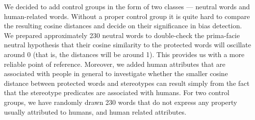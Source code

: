 \documentclass[
  12pt,
]{book}
\begin{document}
We decided to add control groups in the form of two classes --- neutral words and human-related words. Without a proper control group it is quite hard to compare the resulting cosine distances and decide on their significance in bias detection. We prepared approximately 230 neutral words to double-check the prima-facie neutral hypothesis that their cosine similarity to the protected words will oscillate around 0 (that is, the distances will be around 1). This provides us with a more reliable point of reference. Moreover, we added human attributes that are associated with people in general to investigate whether the smaller cosine distance between protected words and stereotypes can result simply from the fact that the stereotype predicates are associated with humans. For two control groups, we have randomly drawn 230 words that do not express any property usually attributed to humans, and human related attributes.

\pagebreak 
\vspace{1mm}
\footnotesize

\begin{table}

\caption{\label{tab:religionTableHead}Head of the religion dataset.}
\centering
{}
\end{table}
\normalsize
\end{document}
